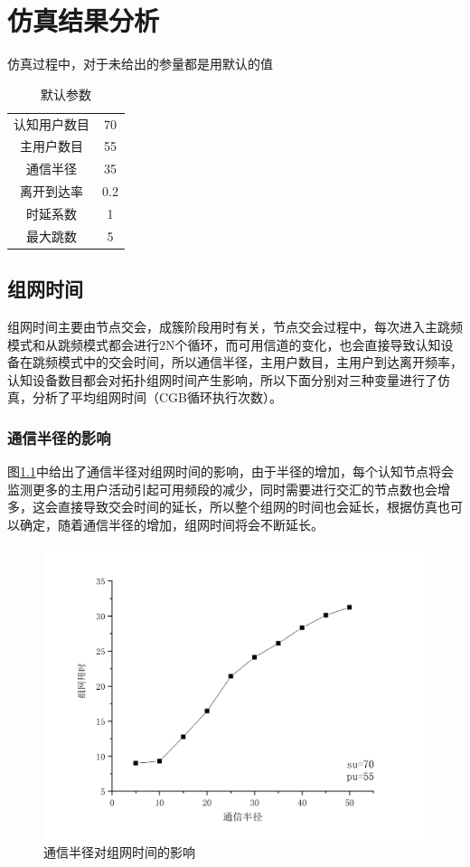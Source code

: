 \documentclass[a4paper,AutoFakeBold,oneside,12pt]{book}
\begin{document}
\chapter{仿真结果分析}
  仿真过程中，对于未给出的参量都是用默认的值
  \begin{table}[h]
  \setlength{\belowcaptionskip}{7pt}
  \centering
  \caption{默认参数}
 
  \begin{tabular}{cc} 
  认知用户数目&70\\
  主用户数目&55\\
  通信半径&35\\
  离开到达率&0.2\\
  时延系数&1\\
  最大跳数&5
  \end{tabular}
  \end{table}
  \section{组网时间}
   组网时间主要由节点交会，成簇阶段用时有关，节点交会过程中，每次进入主跳频模式和从跳频模式都会进行2N个循环，而可用信道的变化，也会直接导致认知设备在跳频模式中的交会时间，所以通信半径，主用户数目，主用户到达离开频率，认知设备数目都会对拓扑组网时间产生影响，所以下面分别对三种变量进行了仿真，分析了平均组网时间（CGB循环执行次数）。
  \subsection{通信半径的影响}
  图\ref{data-1R}中给出了通信半径对组网时间的影响，由于半径的增加，每个认知节点将会监测更多的主用户活动引起可用频段的减少，同时需要进行交汇的节点数也会增多，这会直接导致交会时间的延长，所以整个组网的时间也会延长，根据仿真也可以确定，随着通信半径的增加，组网时间将会不断延长。
   \begin{figure}[htbp]
\centering %
\includegraphics[scale=0.3]{pictures/data-1R.png} 
\caption{通信半径对组网时间的影响 } %
\label{data-1R}
\end{figure}
 
\end{document}
